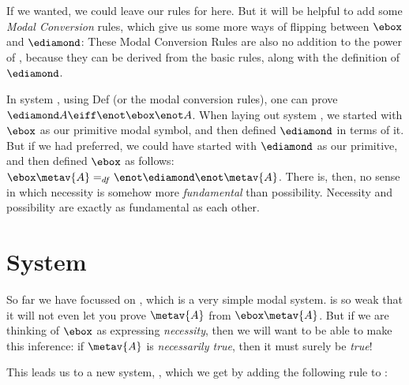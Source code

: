 If we wanted, we could leave our rules for \mlK{} here. But it will be helpful to add some \emph{Modal Conversion} rules, which give us some more ways of flipping between $\ebox$ and $\ediamond$:
These Modal Conversion Rules are also no addition to the power of \mlK, because they can be derived from the basic rules, along with the definition of $\ediamond$.

In system \mlK, using Def\ediamond{} (or the modal conversion rules), one can prove $\ediamond A \eiff \enot\ebox\enot A$. When laying out system \mlK, we started with $\ebox$ as our primitive modal symbol, and then defined $\ediamond$ in terms of it. But if we had preferred, we could have started with $\ediamond$ as our primitive, and then defined $\ebox$ as follows: $\ebox\metav{A} =_{df} \enot \ediamond \enot \metav{A}$. There is, then, no sense in which necessity is somehow more \emph{fundamental} than possibility. Necessity and possibility are exactly as fundamental as each other.

\section{System \mlT}
\label{T}

So far we have focussed on \mlK, which is a very simple modal system. \mlK{} is so weak that it will not even let you prove $\metav{A}$ from $\ebox\metav{A}$. But if we are thinking of $\ebox$ as expressing \emph{necessity}, then we will want to be able to make this inference: if $\metav{A}$ is \emph{necessarily true}, then it must surely be \emph{true}!

This leads us to a new system,  \mlT, which we get by adding the following rule to \mlK:

